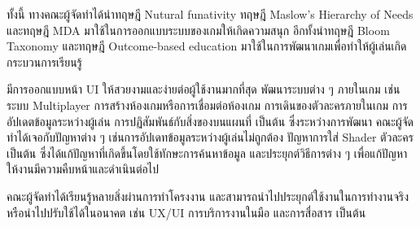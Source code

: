 \documentclass[12pt,oneside,openright,a4paper]{cpe-thai-project}
\begin{document}
  ทั้งนี้ ทางคณะผู้จัดทำได้นำทฤษฎี Nutural funativity ทฤษฎี Maslow’s Hierarchy of Needs 
  และทฤษฎี MDA  มาใช้ในการออกแบบระบบของเกมให้เกิดความสนุก อีกทั้งนำทฤษฎี Bloom Taxonomy 
  และทฤษฎี Outcome-based education มาใช้ในการพัฒนาเกมเพื่อทำให้ผู้เล่นเกิดกระบวนการเรียนรู้

  มีการออกแบบหน้า UI ให้สวยงามและง่ายต่อผู้ใช้งานมากที่สุด พัฒนาระบบต่าง ๆ ภายในเกม 
  เช่นระบบ Multiplayer การสร้างห้องเกมหรือการเชื่อมต่อห้องเกม การเดินของตัวละครภายในเกม 
  การอัปเดตข้อมูลระหว่างผู้เล่น การปฏิสัมพันธ์กับสิ่งของบนแผนที่ เป็นต้น ซึ่งระหว่างการพัฒนา 
  คณะผู้จัดทำได้เจอกับปัญหาต่าง ๆ เช่นการอัปเดทข้อมูลระหว่างผู้เล่นไม่ถูกต้อง ปัญหาการใส่ Shader ตัวละคร เป็นต้น 
  ซึ่งได้แก้ปัญหาที่เกิดขึ้นโดยใช้ทักษะการค้นหาข้อมูล และประยุกต์วิธีการต่าง ๆ เพื่อแก้ปัญหาให้งานมีความคืบหน้าและดำเนินต่อไป 

  คณะผู้จัดทำได้เรียนรู้หลายสิ่งผ่านการทำโครงงาน และสามารถนำไปประยุกต์ใช้งานในการทำงานจริง 
  หรือนำไปปรับใช้ได้ในอนาคต เช่น UX/UI การบริการงานในมือ และการสื่อสาร เป็นต้น
\end{document}
